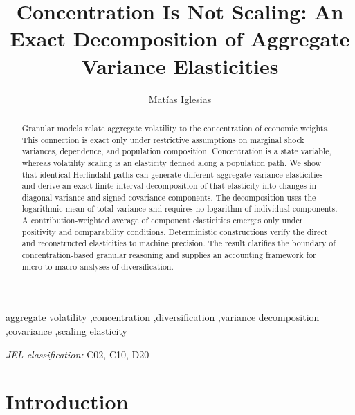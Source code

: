 \documentclass[preprint,12pt,authoryear]{elsarticle}
\begin{document}
\begin{frontmatter}

\title{
Concentration Is Not Scaling:
An Exact Decomposition of Aggregate Variance Elasticities
}

\author[aff1]{Matías Iglesias}

\address[aff1]{
Departamento de Computación, Facultad de Ciencias Exactas y Naturales,
Universidad de Buenos Aires, Buenos Aires, Argentina
}

\begin{abstract}
Granular models relate aggregate volatility to the concentration of
economic weights. This connection is exact only under restrictive
assumptions on marginal shock variances, dependence, and population
composition. Concentration is a state variable, whereas volatility
scaling is an elasticity defined along a population path. We show that
identical Herfindahl paths can generate different aggregate-variance
elasticities and derive an exact finite-interval decomposition of that
elasticity into changes in diagonal variance and signed covariance
components. The decomposition uses the logarithmic mean of total
variance and requires no logarithm of individual components. A
contribution-weighted average of component elasticities emerges only
under positivity and comparability conditions. Deterministic
constructions verify the direct and reconstructed elasticities to
machine precision. The result clarifies the boundary of
concentration-based granular reasoning and supplies an accounting
framework for micro-to-macro analyses of diversification.
\end{abstract}

\begin{keyword}
aggregate volatility
\sep concentration
\sep diversification
\sep variance decomposition
\sep covariance
\sep scaling elasticity

\medskip
\textit{JEL classification:} C02, C10, D20
\end{keyword}

\end{frontmatter}


\section{Introduction}
\label{sec:introduction}
\end{document}
